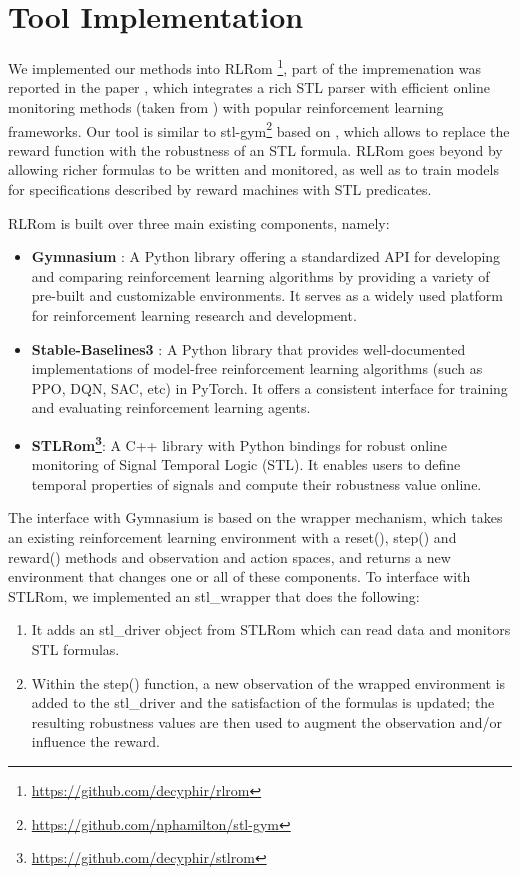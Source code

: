\chapter{Tool Implementation}\label{ch:rlrom}
We implemented our methods into RLRom \footnote{\url{https://github.com/decyphir/rlrom}}, part of the impremenation was reported in the paper \cite{gomezruiz2025overlay}, which integrates a rich STL parser with efficient online monitoring methods 
(taken from \cite{donze2013,deshmukh_robust_2015})  with popular reinforcement learning frameworks. Our tool is similar to stl-gym\footnote{\url{https://github.com/nphamilton/stl-gym}} 
based on \cite{nickovic_rtamt_2020}, which allows to replace the reward function with the robustness of an STL formula. RLRom goes beyond by allowing richer formulas to be written and monitored, 
as well as to train models for specifications described by reward machines with STL predicates.  

RLRom is built over three main existing components, namely:
\begin{itemize}
\item \textbf{Gymnasium} \cite{Towers2024Gymnasium}: A Python library offering a standardized API for developing and comparing reinforcement learning algorithms by providing a variety 
of pre-built and customizable environments. It serves as a widely used platform for reinforcement learning research and development.
\item \textbf{Stable-Baselines3} \cite{stable-baselines3}: A Python library that provides well-documented implementations of model-free reinforcement learning algorithms 
(such as PPO, DQN, SAC, etc) in PyTorch. It offers a consistent interface for training and evaluating reinforcement learning agents.
\item \textbf{STLRom\footnote{\url{https://github.com/decyphir/stlrom}}}: A C++ library with Python bindings for robust online monitoring of Signal Temporal Logic (STL). It enables users to 
define temporal properties of signals and compute their robustness value online.
\end{itemize}

The interface with Gymnasium is based on the wrapper mechanism, which takes an existing reinforcement learning environment with a reset(), step() and reward() methods and observation and action 
spaces, and returns a new environment that changes one or all of these components. To interface with STLRom, we implemented an stl\_wrapper that does the following:
\begin{enumerate}
    \item It adds an stl\_driver object from STLRom which can read data and monitors STL formulas.
    \item Within the step() function, a new observation of the wrapped environment is added to the stl\_driver and the satisfaction of the formulas is updated; the resulting robustness values 
    are then used to augment the observation and/or influence the reward.
\end{enumerate}

